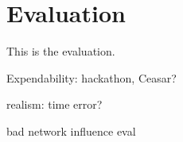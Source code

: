 \chapter{Evaluation}
\label{cha:evaluation}

This is the evaluation.


Expendability: hackathon, Ceasar?

realism: time error?

bad network influence eval
